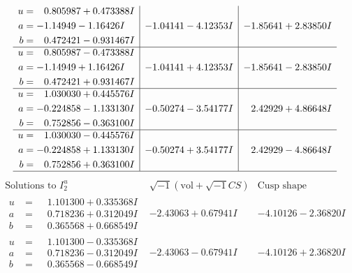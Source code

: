 \documentclass[1p]{elsarticle_modified}
\theoremstyle{definition}
\newcommand{\I}{\sqrt{-1}}
\begin{document}
$$\begin{array}{c|c|c}
\begin{aligned}
u &= \phantom{-}0.805987 + 0.473388 I \\
a &= -1.14949 - 1.16426 I \\
b &= \phantom{-}0.472421 - 0.931467 I\end{aligned}
 & -1.04141 - 4.12353 I & -1.85641 + 2.83850 I \\ \hline\begin{aligned}
u &= \phantom{-}0.805987 - 0.473388 I \\
a &= -1.14949 + 1.16426 I \\
b &= \phantom{-}0.472421 + 0.931467 I\end{aligned}
 & -1.04141 + 4.12353 I & -1.85641 - 2.83850 I \\ \hline\begin{aligned}
u &= \phantom{-}1.030030 + 0.445576 I \\
a &= -0.224858 - 1.133130 I \\
b &= \phantom{-}0.752856 - 0.363100 I\end{aligned}
 & -0.50274 - 3.54177 I & \phantom{-}2.42929 + 4.86648 I \\ \hline\begin{aligned}
u &= \phantom{-}1.030030 - 0.445576 I \\
a &= -0.224858 + 1.133130 I \\
b &= \phantom{-}0.752856 + 0.363100 I\end{aligned}
 & -0.50274 + 3.54177 I & \phantom{-}2.42929 - 4.86648 I\\
 \hline 
 \end{array}$$\newpage$$\begin{array}{c|c|c}  
\text{Solutions to }I^u_{2}& \I (\text{vol} + \sqrt{-1}CS) & \text{Cusp shape}\\
 \hline 
\begin{aligned}
u &= \phantom{-}1.101300 + 0.335368 I \\
a &= \phantom{-}0.718236 + 0.312049 I \\
b &= \phantom{-}0.365568 + 0.668549 I\end{aligned}
 & -2.43063 + 0.67941 I & -4.10126 - 2.36820 I \\ \hline\begin{aligned}
u &= \phantom{-}1.101300 - 0.335368 I \\
a &= \phantom{-}0.718236 - 0.312049 I \\
b &= \phantom{-}0.365568 - 0.668549 I\end{aligned}
 & -2.43063 - 0.67941 I & -4.10126 + 2.36820 I \\ \hline\begin{aligned}

\end{aligned}
\end{array}$$
\end{document}
